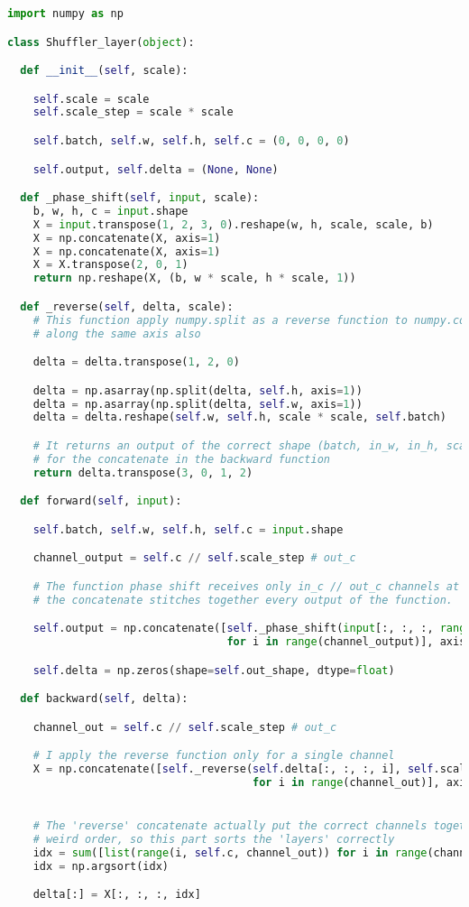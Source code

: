 \documentclass{standalone}
\begin{document}
\lstset{style=snippet}
\begin{lstlisting}[language=Python, caption=NumPyNet version of Pixel-Shuffle function, label=code:py_shuffle]
import numpy as np

class Shuffler_layer(object):

  def __init__(self, scale):

    self.scale = scale
    self.scale_step = scale * scale

    self.batch, self.w, self.h, self.c = (0, 0, 0, 0)

    self.output, self.delta = (None, None)

  def _phase_shift(self, input, scale):
    b, w, h, c = input.shape
    X = input.transpose(1, 2, 3, 0).reshape(w, h, scale, scale, b)
    X = np.concatenate(X, axis=1)
    X = np.concatenate(X, axis=1)
    X = X.transpose(2, 0, 1)
    return np.reshape(X, (b, w * scale, h * scale, 1))

  def _reverse(self, delta, scale):
    # This function apply numpy.split as a reverse function to numpy.concatenate
    # along the same axis also

    delta = delta.transpose(1, 2, 0)

    delta = np.asarray(np.split(delta, self.h, axis=1))
    delta = np.asarray(np.split(delta, self.w, axis=1))
    delta = delta.reshape(self.w, self.h, scale * scale, self.batch)

    # It returns an output of the correct shape (batch, in_w, in_h, scale**2)
    # for the concatenate in the backward function
    return delta.transpose(3, 0, 1, 2)

  def forward(self, input):

    self.batch, self.w, self.h, self.c = input.shape

    channel_output = self.c // self.scale_step # out_c

    # The function phase shift receives only in_c // out_c channels at a time
    # the concatenate stitches together every output of the function.

    self.output = np.concatenate([self._phase_shift(input[:, :, :, range(i, self.c, channel_output)], self.scale)
                                  for i in range(channel_output)], axis=3)

    self.delta = np.zeros(shape=self.out_shape, dtype=float)

  def backward(self, delta):

    channel_out = self.c // self.scale_step # out_c

    # I apply the reverse function only for a single channel
    X = np.concatenate([self._reverse(self.delta[:, :, :, i], self.scale)
                                      for i in range(channel_out)], axis=3)


    # The 'reverse' concatenate actually put the correct channels together but in a
    # weird order, so this part sorts the 'layers' correctly
    idx = sum([list(range(i, self.c, channel_out)) for i in range(channel_out)], [])
    idx = np.argsort(idx)

    delta[:] = X[:, :, :, idx]

\end{lstlisting}
\end{document}
